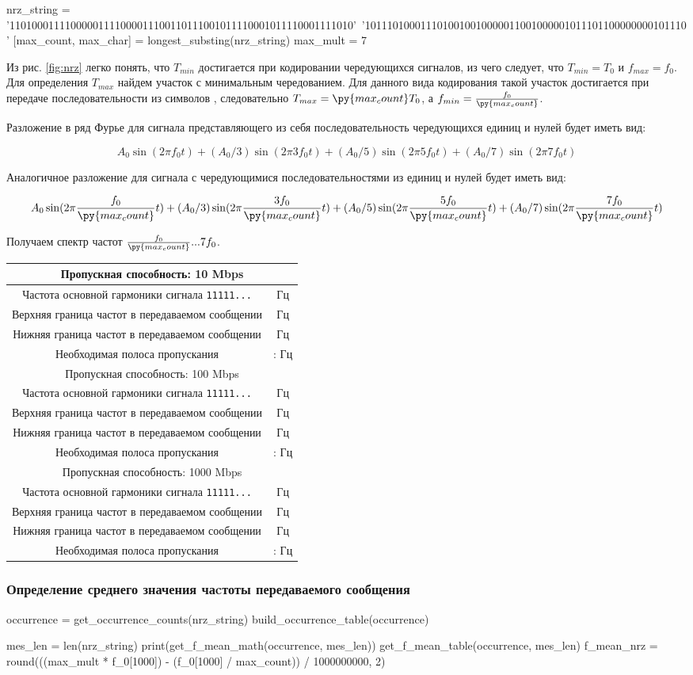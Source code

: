 \documentclass[12pt, a4paper]{article}
\newcommand{\bandwidthEntry}[2]{
  \hline
  \multicolumn{2}{|c|}{Пропускная способность: #1 Mbps} \\
  \hline
  Частота основной гармоники сигнала \texttt{11111...} & \py{int(f_0[#1] * #2)} Гц \\
  Верхняя граница частот в передаваемом сообщении & \py{int(max_mult * f_0[#1])} Гц \\
  Нижняя граница частот в передаваемом сообщении & \py{int(f_0[#1] / max_count)} Гц \\
  Необходимая полоса пропускания & \py{int(f_0[#1] / max_count)} : \py{int(max_mult * f_0[#1])} Гц \\
}
\begin{document}
\begin{pycode}
nrz_string = '11010001111000001111000011100110111001011110001011110001111010'\
  '1011101000111010010010000011001000001011101100000000101110'
[max_count, max_char] = longest_substing(nrz_string)
max_mult = 7
\end{pycode}

Из рис. \ref{fig:nrz} легко понять, что $T_{min}$ достигается при кодировании чередующихся
сигналов, из чего следует, что $T_{min} = T_0$ и $f_{max} = f_0$. Для определения
$T_{max}$ найдем участок с минимальным чередованием. Для данного вида кодирования
такой участок достигается при передаче последовательности из \py{max_count}
символов \texttt{\py{max_char}},
следовательно $T_{max} = \py{max_count} T_0$, а $f_{min} = \frac{f_0}{\py{max_count}}$.

Разложение в ряд Фурье для сигнала представляющего из себя последовательность
чередующихся единиц и нулей будет иметь вид:

$$A_0 \sin(2 \pi f_0 t) + (A_0 / 3) \sin(2 \pi 3 f_0 t) +
  (A_0 / 5) \sin(2 \pi 5 f_0 t) + (A_0 / 7) \sin(2 \pi 7 f_0 t)$$

Аналогичное разложение для сигнала с чередующимися последовательностями из
\py{max_count} единиц и нулей будет иметь вид:

$$A_0 \sin(2 \pi \frac{f_0}{\py{max_count}} t) + (A_0 / 3) \sin(2 \pi \frac{3 f_0}{\py{max_count}} t) +
  (A_0 / 5) \sin(2 \pi \frac{5 f_0}{\py{max_count}} t) + (A_0 / 7) \sin(2 \pi \frac{7 f_0}{\py{max_count}} t)$$

Получаем спектр частот $\frac{f_0}{\py{max_count}}...7 f_0$.

\newpage

\begin{tabular}{| c | c |}
  \bandwidthEntry{10}{0}
  \bandwidthEntry{100}{0}
  \bandwidthEntry{1000}{0}
  \hline
\end{tabular}

\subsubsection*{Определение среднего значения чаcтоты передаваемого сообщения}

\begin{pycode}
occurrence = get_occurrence_counts(nrz_string)
build_occurrence_table(occurrence)

mes_len = len(nrz_string)
print(get_f_mean_math(occurrence, mes_len))
get_f_mean_table(occurrence, mes_len)
f_mean_nrz = round(((max_mult * f_0[1000]) - (f_0[1000] / max_count)) / 1000000000, 2)
\end{pycode}
\end{document}
